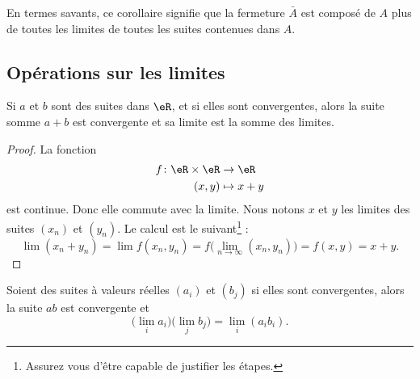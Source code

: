 En termes savants, ce corollaire signifie que la fermeture $\bar A$ est composé de $A$ plus de toutes les limites de toutes les suites contenues dans $A$.

\subsection{Opérations sur les limites}

\begin{lemma}       \label{LEMooSFBLooKSXiyj}
    Si \( a\) et \( b\) sont des suites dans \( \eR\), et si elles sont convergentes, alors la suite somme \( a+b\) est convergente et sa limite est la somme des limites.
\end{lemma}

\begin{proof}
    La fonction 
    \begin{equation}
        \begin{aligned}
            f\colon \eR\times \eR&\to \eR \\
            (x,y)&\mapsto x+y 
        \end{aligned}
    \end{equation}
    est continue. Donc elle commute avec la limite. Nous notons \( x\) et \( y\) les limites des suites \( (x_n)\) et \( (y_n)\). Le calcul est le suivant\footnote{Assurez vous d'être capable de justifier les étapes.} :
    \begin{equation}
        \lim (x_n+y_n)=\lim f(x_n,y_n)=f\big( \lim_{n\to \infty} (x_n,y_n) \big)=f(x,y)=x+y.
    \end{equation}
\end{proof}

\begin{proposition}     \label{PROPooIQOAooJPMoDD}
    Soient des suites à valeurs réelles \( (a_i)\) et \( (b_j)\) si elles sont convergentes, alors la suite \( ab\) est convergente et
    \begin{equation}
        \big( \lim_ia_i \big)\big( \lim_jb_j \big)=\lim_i(a_ib_i).
    \end{equation}
\end{proposition}
 
